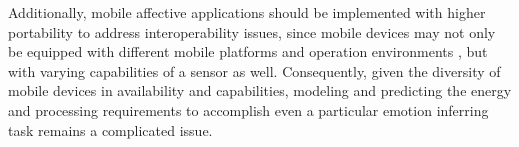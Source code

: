 Additionally, mobile affective applications should be implemented with higher portability to address interoperability issues, since mobile devices may not only be equipped with different mobile platforms and operation environments \cite{khan2013mobile}, but with varying capabilities of a sensor as well. Consequently, given the diversity of mobile devices in availability and capabilities, modeling and predicting the energy and processing requirements to accomplish even a particular emotion inferring task remains a complicated issue.